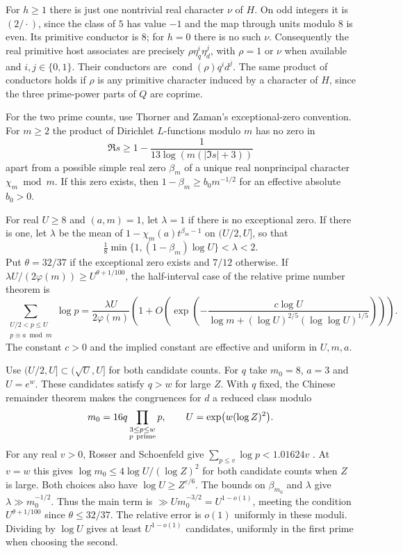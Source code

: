 For \(h\ge1\) there is just one nontrivial real character \(\nu\)
of \(H\). On odd integers it is \((2/\cdot)\), since the class of
\(5\) has value \(-1\) and the map through units modulo \(8\) is even.
Its primitive conductor is \(8\); for \(h=0\) there is no such \(\nu\).
Consequently the real primitive host associates are precisely
\(\rho\eta_q^i\eta_d^j\), with \(\rho=1\) or \(\nu\) when available
and \(i,j\in\{0,1\}\). Their conductors are
\(\operatorname{cond}(\rho)q^id^j\). The same product of conductors
holds if \(\rho\) is any primitive character induced by a character
of \(H\), since the three prime-power parts of \(Q\) are coprime.

For the two prime counts, use Thorner and Zaman's exceptional-zero
convention. For \(m\ge2\) the product of Dirichlet \(L\)-functions
modulo \(m\) has no zero in
\[
 \Re s\ge 1-\frac{1}{13\log(m(|\Im s|+3))}
\]
apart from a possible simple real zero \(\beta_m\) of a unique real
nonprincipal character \(\chi_m\bmod m\). If this zero exists, then
\(1-\beta_m\ge b_0 m^{-1/2}\) for an effective absolute \(b_0>0\).
\cite[arXiv v2, preceding Theorem~1.1 and (1.2)]{f1thorner-zaman}

For real \(U\ge8\) and \((a,m)=1\), let \(\lambda=1\) if there is
no exceptional zero. If there is one, let \(\lambda\) be the mean of
\(1-\chi_m(a)t^{\beta_m-1}\) on \((U/2,U]\), so that
\begin{equation}
\label{eq:family-prime-multiplier}
 \tfrac18\min\{1,(1-\beta_m)\log U\}<\lambda<2.
\end{equation}
Put \(\theta=32/37\) if the exceptional zero exists and \(7/12\)
otherwise. If \(\lambda U/(2\varphi(m))\ge U^{\theta+1/100}\), the
half-interval case of the relative prime number theorem is
\[
 \sum_{\substack{U/2<p\le U\\ p\equiv a\bmod m}}\log p
 =\frac{\lambda U}{2\varphi(m)}
 \left(1+O\left(\exp\left(
   -\frac{c\log U}{\log m+(\log U)^{2/5}(\log\log U)^{1/5}}
 \right)\right)\right).
\]
The constant \(c>0\) and the implied constant are effective and
uniform in \(U,m,a\).
\cite[arXiv v2, Theorem~1.1 and (1.7)]{f1thorner-zaman}

Use \((U/2,U]\subset(\sqrt U,U]\) for both candidate counts. For \(q\)
take \(m_0=8\), \(a=3\) and \(U=e^w\). These candidates satisfy \(q>w\)
for large \(Z\). With \(q\) fixed, the Chinese remainder theorem makes
the congruences for \(d\) a reduced class modulo
\[
  m_0=16q\prod_{\substack{3\le p\le w\\ p\ {\rm prime}}}p,
  \qquad U=\exp\bigl(w(\log Z)^2\bigr).
\]
For any real \(v>0\), Rosser and Schoenfeld give
\(\sum_{p\le v}\log p<1.01624v\)
\cite[Theorem~9, (3.32)]{rosser-schoenfeld}. At \(v=w\) this gives
\(\log m_0\le4\log U/(\log Z)^2\) for both candidate counts when \(Z\)
is large. Both choices also have \(\log U\ge Z^{\varepsilon/6}\).
The bounds on \(\beta_{m_0}\) and \(\lambda\) give
\(\lambda\gg m_0^{-1/2}\). Thus the main term is
\(\gg U m_0^{-3/2}=U^{1-o(1)}\), meeting the condition
\(U^{\theta+1/100}\) since \(\theta\le32/37\). The relative error
is \(o(1)\) uniformly in these moduli. Dividing by \(\log U\)
gives at least \(U^{1-o(1)}\) candidates, uniformly in the first
prime when choosing the second.

